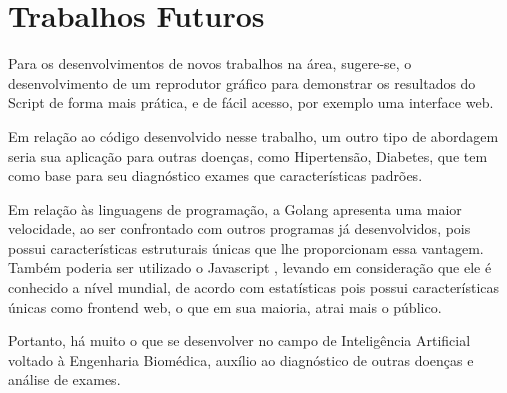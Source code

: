 \chapter{Trabalhos Futuros}
\label{chapter:trabalhos_futuros}

Para os desenvolvimentos de novos trabalhos na área, sugere-se, o desenvolvimento de um reprodutor gráfico para demonstrar os resultados do Script de forma mais prática, e de fácil acesso, por exemplo uma interface web. 

Em relação ao código desenvolvido nesse trabalho, um outro tipo de abordagem seria sua aplicação para outras doenças, como Hipertensão, Diabetes, que tem como base para seu diagnóstico exames que características padrões.

Em relação às linguagens de programação, a Golang \cite{GO} apresenta uma maior velocidade, ao ser confrontado com outros programas já desenvolvidos, pois possui características estruturais únicas que lhe proporcionam essa vantagem. Também poderia ser utilizado o Javascript \cite{JAVASCRIPT}, levando em consideração que ele é conhecido a nível mundial, de acordo com estatísticas pois possui características únicas como frontend web, o que em sua maioria, atrai mais o público.

Portanto, há muito o que se desenvolver no campo de Inteligência Artificial voltado à Engenharia Biomédica, auxílio ao diagnóstico de outras doenças e análise de exames.

